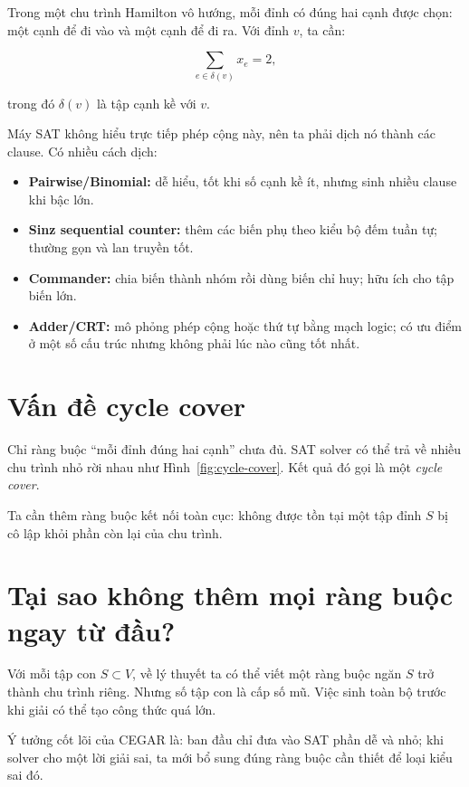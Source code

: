 \documentclass[11pt,a4paper,oneside]{scrreprt}
\begin{document}
Trong một chu trình Hamilton vô hướng, mỗi đỉnh có đúng hai cạnh được chọn: một cạnh để đi vào và một cạnh để đi ra. Với đỉnh $v$, ta cần:

\[
  \sum_{e\in\delta(v)} x_e = 2,
\]

trong đó $\delta(v)$ là tập cạnh kề với $v$.

Máy SAT không hiểu trực tiếp phép cộng này, nên ta phải dịch nó thành các clause. Có nhiều cách dịch:

\begin{itemize}
  \item \textbf{Pairwise/Binomial:} dễ hiểu, tốt khi số cạnh kề ít, nhưng sinh nhiều clause khi bậc lớn.
  \item \textbf{Sinz sequential counter:} thêm các biến phụ theo kiểu bộ đếm tuần tự; thường gọn và lan truyền tốt.
  \item \textbf{Commander:} chia biến thành nhóm rồi dùng biến chỉ huy; hữu ích cho tập biến lớn.
  \item \textbf{Adder/CRT:} mô phỏng phép cộng hoặc thứ tự bằng mạch logic; có ưu điểm ở một số cấu trúc nhưng không phải lúc nào cũng tốt nhất.
\end{itemize}

\section{Vấn đề cycle cover}

Chỉ ràng buộc ``mỗi đỉnh đúng hai cạnh'' chưa đủ. SAT solver có thể trả về nhiều chu trình nhỏ rời nhau như Hình~\ref{fig:cycle-cover}. Kết quả đó gọi là một \emph{cycle cover}.

Ta cần thêm ràng buộc kết nối toàn cục: không được tồn tại một tập đỉnh $S$ bị cô lập khỏi phần còn lại của chu trình.

\section{Tại sao không thêm mọi ràng buộc ngay từ đầu?}

Với mỗi tập con $S\subset V$, về lý thuyết ta có thể viết một ràng buộc ngăn $S$ trở thành chu trình riêng. Nhưng số tập con là cấp số mũ. Việc sinh toàn bộ trước khi giải có thể tạo công thức quá lớn.

\begin{resultbox}
Ý tưởng cốt lõi của CEGAR là: ban đầu chỉ đưa vào SAT phần dễ và nhỏ; khi solver cho một lời giải sai, ta mới bổ sung đúng ràng buộc cần thiết để loại kiểu sai đó.
\end{resultbox}
\end{document}
